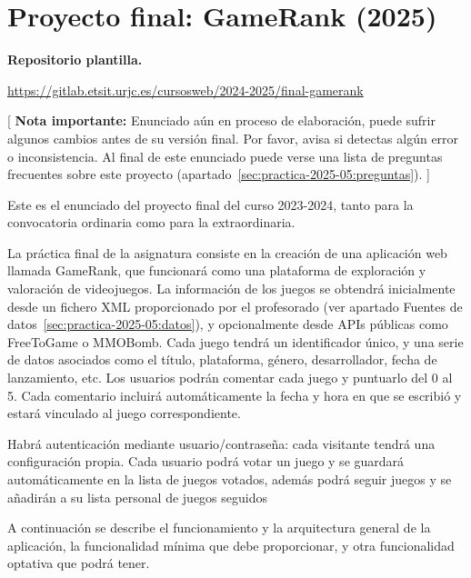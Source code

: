 \section{Proyecto final: GameRank (2025)}
\label{practica-final-2025-05}

\textbf{Repositorio plantilla.}

\url{https://gitlab.etsit.urjc.es/cursosweb/2024-2025/final-gamerank}

[ \textbf{Nota importante:} Enunciado aún en proceso de elaboración, puede sufrir algunos cambios antes de su versión final. Por favor, avisa si detectas algún error o inconsistencia. Al final de este enunciado puede verse una lista de preguntas frecuentes sobre este proyecto (apartado~\ref{sec:practica-2025-05:preguntas}). ]


Este es el enunciado del proyecto final del curso 2023-2024, tanto para la convocatoria ordinaria como para la extraordinaria.

La práctica final de la asignatura consiste en la creación de una aplicación web llamada GameRank, que funcionará como una plataforma de exploración y valoración de videojuegos. La información de los juegos se obtendrá inicialmente desde un fichero XML proporcionado por el profesorado (ver apartado Fuentes de datos~\ref{sec:practica-2025-05:datos}), y opcionalmente desde APIs públicas como FreeToGame o MMOBomb. Cada juego tendrá un identificador único, y una serie de datos asociados como el título, plataforma, género, desarrollador, fecha de lanzamiento, etc. Los usuarios podrán comentar cada juego y puntuarlo del 0 al 5. Cada comentario incluirá automáticamente la fecha y hora en que se escribió y estará vinculado al juego correspondiente.

Habrá autenticación mediante usuario/contraseña: cada visitante tendrá una configuración propia. Cada usuario podrá votar un juego y se guardará automáticamente en la lista de juegos votados, además podrá seguir juegos y se añadirán a su lista personal de juegos seguidos

A continuación se describe el funcionamiento y la arquitectura general de la aplicación, la funcionalidad mínima que debe proporcionar, y otra funcionalidad optativa que podrá tener.

